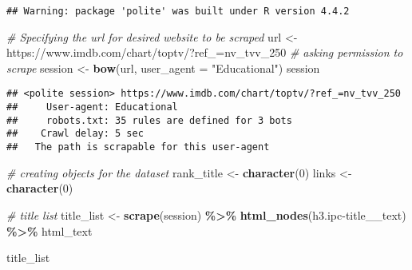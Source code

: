 \documentclass[
]{article}
\newenvironment{Shaded}{\begin{snugshade}}{\end{snugshade}}
\newcommand{\AttributeTok}[1]{\textcolor[rgb]{0.13,0.29,0.53}{#1}}
\newcommand{\CommentTok}[1]{\textcolor[rgb]{0.56,0.35,0.01}{\textit{#1}}}
\newcommand{\DecValTok}[1]{\textcolor[rgb]{0.00,0.00,0.81}{#1}}
\newcommand{\FunctionTok}[1]{\textcolor[rgb]{0.13,0.29,0.53}{\textbf{#1}}}
\newcommand{\NormalTok}[1]{#1}
\newcommand{\OtherTok}[1]{\textcolor[rgb]{0.56,0.35,0.01}{#1}}
\newcommand{\SpecialCharTok}[1]{\textcolor[rgb]{0.81,0.36,0.00}{\textbf{#1}}}
\newcommand{\StringTok}[1]{\textcolor[rgb]{0.31,0.60,0.02}{#1}}
\begin{document}
\begin{verbatim}
## Warning: package 'polite' was built under R version 4.4.2
\end{verbatim}

\begin{Shaded}
\begin{Highlighting}[]
\CommentTok{\# Specifying the url for desired website to be scraped}
\NormalTok{url }\OtherTok{\textless{}{-}} \StringTok{\textquotesingle{}https://www.imdb.com/chart/toptv/?ref\_=nv\_tvv\_250\textquotesingle{}}
\CommentTok{\# asking permission to scrape}
\NormalTok{session }\OtherTok{\textless{}{-}} \FunctionTok{bow}\NormalTok{(url, }\AttributeTok{user\_agent =} \StringTok{"Educational"}\NormalTok{)}
\NormalTok{session}
\end{Highlighting}
\end{Shaded}

\begin{verbatim}
## <polite session> https://www.imdb.com/chart/toptv/?ref_=nv_tvv_250
##     User-agent: Educational
##     robots.txt: 35 rules are defined for 3 bots
##    Crawl delay: 5 sec
##   The path is scrapable for this user-agent
\end{verbatim}

\begin{Shaded}
\begin{Highlighting}[]
\CommentTok{\# creating objects for the dataset}
\NormalTok{rank\_title }\OtherTok{\textless{}{-}} \FunctionTok{character}\NormalTok{(}\DecValTok{0}\NormalTok{)}
\NormalTok{links }\OtherTok{\textless{}{-}} \FunctionTok{character}\NormalTok{(}\DecValTok{0}\NormalTok{)}

\CommentTok{\# title list}
\NormalTok{title\_list }\OtherTok{\textless{}{-}} \FunctionTok{scrape}\NormalTok{(session) }\SpecialCharTok{\%\textgreater{}\%}
  \FunctionTok{html\_nodes}\NormalTok{(}\StringTok{\textquotesingle{}h3.ipc{-}title\_\_text\textquotesingle{}}\NormalTok{) }\SpecialCharTok{\%\textgreater{}\%} 
\NormalTok{  html\_text}

\NormalTok{title\_list}
\end{Highlighting}
\end{Shaded}
\end{document}

